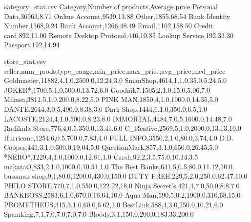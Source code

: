 \begin{filecontents*}[overwrite]{category_stat.csv}
Category,Number of products,Average price
Personal Data,36963,8.71
Online Account,9539,13.88
Other,1855,68.54
Bank Identity Number,1368,9.24
Bank Account,1266,48.49
Email,1102,158.50
Credit card,892,11.00
Remote Desktop Protocol,446,10.85
Lookup Service,192,33.30
Passport,192,14.94
\end{filecontents*}

\begin{filecontents*}[overwrite]{store_stat.csv}
seller,num_prods,type_range,min_price,max_price,avg_price,med_price
Goldmaster,11882,4,1.0,2500.0,12.24,3.0
SmanShop,4614,1,1.0,35.0,5.24,5.0
JOKER*,1700,5,1.0,500.0,13.72,6.0
Goodnik7,1505,2,1.0,15.0,5.06,7.0
Mikasa,3811,5,1.0,200.0,8.22,5.0
PINK MAN,1850,4,1.0,1000.0,14.35,5.0
DANTE,2644,3,0.5,490.0,8.38,3.0
Dark Shop,1444,6,1.0,350.0,6.5,1.0
LACOSTE,2124,4,1.0,500.0,8.23,8.0
IMMORTAL,4484,7,0.5,1600.0,14.48,7.0
Radikula Store,776,4,0.5,350.0,13.41,6.0
C_Reative,2569,5,1.0,2000.0,13.13,10.0
Hurricane,1254,6,0.5,700.0,7.83,4.0
FULL INFO,3550,2,1.0,80.0,3.74,4.0
D.B. Cooper,441,3,1.0,300.0,19.04,5.0
QuestionMark,857,3,1.0,650.0,26.45,5.0
*NERO*,1229,4,1.0,1000.0,12.81,1.0
Carsh,92,2,3.5,75.0,10.14,3.5
makataO,833,2,1.0,1000.0,10.51,1.0
The Best Banks,641,5,0.5,80.0,11.12,10.0
bussman shop,9,1,80.0,1200.0,430.0,150.0
DUTY FREE,229,5,2.0,250.0,62.47,10.0
PHILO STORE,770,7,1.0,550.0,122.22,18.0
Ninja Secret's,421,4,7.0,50.0,8.8,7.0
BANKBOSS,2583,6,1.0,670.0,16.64,10.0
Aqua Man,590,5,0.2,1900.0,310.68,15.0
PROMETHEUS,315,3,1.0,60.0,6.62,1.0
BestLink,588,4,3.0,250.0,10.21,6.0
Spamking,7,1,7.0,7.0,7.0,7.0
Bloody,3,1,150.0,200.0,183.33,200.0
\end{filecontents*}



